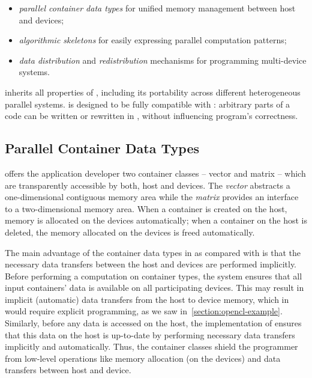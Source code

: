 \begin{itemize}
  \item \emph{parallel container data types} for unified memory management between host and devices;
  \item \emph{algorithmic skeletons} for easily expressing parallel computation patterns;
  \item \emph{data distribution} and \emph{redistribution} mechanisms for programming multi-device systems.
\end{itemize}

\noindent
\SkelCL inherits all properties of \OpenCL, including its portability across different heterogeneous parallel systems.
\SkelCL is designed to be fully compatible with \OpenCL: arbitrary parts of a \SkelCL code can be written or rewritten in \OpenCL, without influencing program's correctness.


\subsection{Parallel Container Data Types}
\label{section:skelcl-programming-model:container}
\SkelCL offers the application developer two container classes -- vector and matrix -- which are transparently accessible by both, host and devices.
The \emph{vector} abstracts a one-dimensional contiguous memory area while the \emph{matrix} provides an interface to a two-dimensional memory area.
When a container is created on the host, memory is allocated on the devices automatically;
when a container on the host is deleted, the memory allocated on the devices is freed automatically.

The main advantage of the container data types in \SkelCL as compared with \OpenCL is that the necessary data transfers between the host and devices are performed implicitly.
Before performing a computation on container types, the \SkelCL system ensures that all input containers' data is available on all participating devices.
This may result in implicit (automatic) data transfers from the host to device memory, which in \OpenCL would require explicit programming, as we saw in~\autoref{section:opencl-example}.
Similarly, before any data is accessed on the host, the implementation of \SkelCL ensures that this data on the host is up-to-date by performing necessary data transfers implicitly and automatically.
Thus, the container classes shield the programmer from low-level operations like memory allocation (on the devices) and data transfers between host and device.

